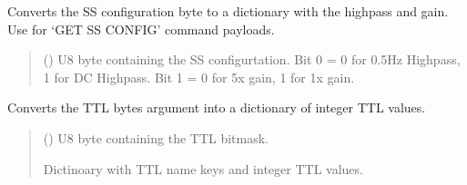 \documentclass[letterpaper,10pt,english]{sphinxmanual}
\begin{document}
\begin{fulllineitems}
\begin{fulllineitems}
\label{\detokenize{Morelia.Devices:Morelia.Devices.PodDevice_8401HR.Pod8401HR.DecodeSSConfigBitmask}}
\pysigstartsignatures
{}
\pysigstopsignatures
\sphinxAtStartPar
Converts the SS configuration byte to a dictionary with the high\sphinxhyphen{}pass and gain.         Use for ‘GET SS CONFIG’ command payloads.
\begin{quote}\begin{description}
\sphinxAtStartPar
{} () \textendash{} U8 byte containing the SS configurtation. Bit 0 = 0 for 0.5Hz Highpass,                 1 for DC Highpass. Bit 1 = 0 for 5x gain, 1 for 1x gain.

\end{description}\end{quote}

\end{fulllineitems}


\begin{fulllineitems}
\label{\detokenize{Morelia.Devices:Morelia.Devices.PodDevice_8401HR.Pod8401HR.DecodeTTLByte}}
\pysigstartsignatures
{}
\pysigstopsignatures
\sphinxAtStartPar
Converts the TTL bytes argument into a dictionary of integer TTL values.
\begin{quote}\begin{description}
\sphinxAtStartPar
{} () \textendash{} U8 byte containing the TTL bitmask.

\sphinxAtStartPar
Dictinoary with TTL name keys and integer TTL values.


\end{description}
\end{quote}
\end{fulllineitems}
\end{fulllineitems}
\end{document}
